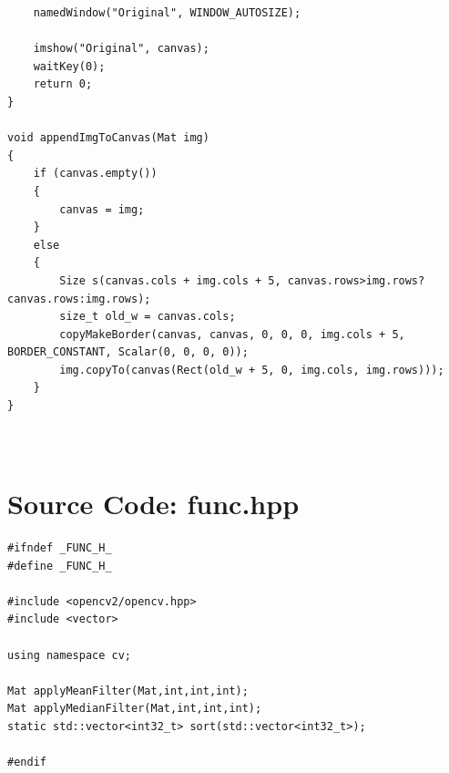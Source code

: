 \documentclass[12pt,a4paper]{report}
\begin{document}
\begin{lstlisting}
    namedWindow("Original", WINDOW_AUTOSIZE);
    
    imshow("Original", canvas);
    waitKey(0);
    return 0;
}

void appendImgToCanvas(Mat img)
{
    if (canvas.empty())
    {
        canvas = img;
    }
    else
    {
        Size s(canvas.cols + img.cols + 5, canvas.rows>img.rows?canvas.rows:img.rows);
        size_t old_w = canvas.cols;
        copyMakeBorder(canvas, canvas, 0, 0, 0, img.cols + 5, BORDER_CONSTANT, Scalar(0, 0, 0, 0));
        img.copyTo(canvas(Rect(old_w + 5, 0, img.cols, img.rows)));
    }
}

  

\end{lstlisting}

\chapter{Source Code: func.hpp}
\begin{lstlisting}
#ifndef _FUNC_H_
#define _FUNC_H_

#include <opencv2/opencv.hpp>
#include <vector>

using namespace cv;

Mat applyMeanFilter(Mat,int,int,int);
Mat applyMedianFilter(Mat,int,int,int);
static std::vector<int32_t> sort(std::vector<int32_t>);

#endif
\end{lstlisting}
\end{document}
